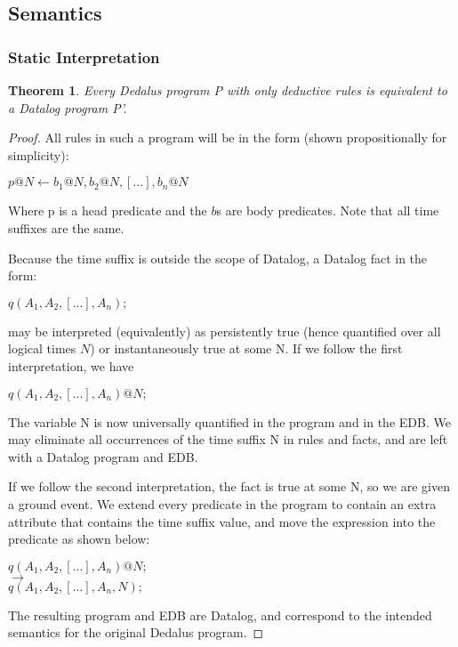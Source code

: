 \subsection{Semantics}


\subsubsection{Static Interpretation}
\newtheorem{theorem}{Theorem}

\begin{theorem}
Every Dedalus program P with only deductive rules is equivalent to a Datalog program P'.
\end{theorem}

\begin{proof}
All rules in such a program will be in the form (shown propositionally for simplicity): 

$p@N \leftarrow b_{1}@N, b_{2}@N, [...], b_{n}@N$

Where p is a head predicate and the $b$s are body predicates.  Note that all time suffixes are 
the same.

Because the time suffix is outside the scope of Datalog, a Datalog fact in the form:

$q(A_{1}, A_{2}, [...], A_{n});$

may be interpreted (equivalently) as persistently true (hence quantified over all logical times $N$) or instantaneously
true at some N.  If we follow the first interpretation, we have 

$q(A_{1}, A_{2}, [...], A_{n})@N;$

The variable N is now universally quantified in the program and in the EDB.  We may eliminate all occurrences of the time suffix N
in rules and facts, and are left with a Datalog program and EDB.

If we follow the second interpretation, the fact is true at some N, so we are given a ground event.  We extend every predicate in 
the program to contain an extra attribute that contains the time suffix value, and move the expression into the predicate as shown below:

$q(A_{1}, A_{2}, [...], A_{n})@N;$\\
$\rightarrow$\\
$q(A_{1}, A_{2}, [...], A_{n}, N);$

The resulting program and EDB are Datalog, and correspond to the intended semantics for the original Dedalus program.

\end{proof}


